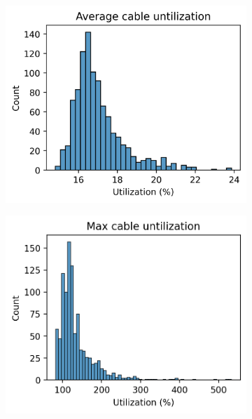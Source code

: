 

\begin{figure}[H]
    \begin{subfigure}{.33\textwidth}
      \centering
      \includegraphics[width=\linewidth]{img/switchstate_exploring/swiss_suburb/histograms/avg_cable_util.png}
      \caption{}
      \label{fig:result:suburban:histograms:avg_cable}
    \end{subfigure}%
    \begin{subfigure}{.33\textwidth}
      \centering
      \includegraphics[width=\linewidth]{img/switchstate_exploring/swiss_suburb/histograms/max_cable_util.png}

\end{subfigure}
\end{figure}
